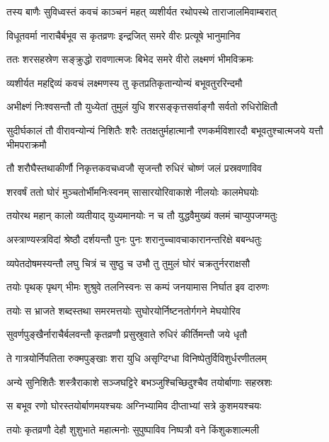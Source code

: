 \twolineshloka
{तस्य बाणैः सुविध्वस्तं कवचं काञ्चनं महत्}
{व्यशीर्यत रथोपस्थे ताराजालमिवाम्बरात्} %

\twolineshloka
{विधूतवर्मा नाराचैर्बभूव स कृतव्रणः}
{इन्द्रजित् समरे वीरः प्रत्यूषे भानुमानिव} %

\twolineshloka
{ततः शरसहस्रेण सङ्क्रुद्धो रावणात्मजः}
{बिभेद समरे वीरो लक्ष्मणं भीमविक्रमः} %

\twolineshloka
{व्यशीर्यत महद्दिव्यं कवचं लक्ष्मणस्य तु}
{कृतप्रतिकृतान्योन्यं बभूवतुररिन्दमौ} %

\twolineshloka
{अभीक्ष्णं निःश्वसन्तौ तौ युध्येतां तुमुलं युधि}
{शरसङ्कृत्तसर्वाङ्गौ सर्वतो रुधिरोक्षितौ} %

\threelineshloka
{सुदीर्घकालं तौ वीरावन्योन्यं निशितैः शरैः}
{ततक्षतुर्महात्मानौ रणकर्मविशारदौ}
{बभूवतुश्चात्मजये यत्तौ भीमपराक्रमौ} %

\twolineshloka
{तौ शरौघैस्तथाकीर्णौ निकृत्तकवचध्वजौ}
{सृजन्तौ रुधिरं चोष्णं जलं प्रस्रवणाविव} %

\twolineshloka
{शरवर्षं ततो घोरं मुञ्चतोर्भीमनिःस्वनम्}
{सासारयोरिवाकाशे नीलयोः कालमेघयोः} %

\twolineshloka
{तयोरथ महान् कालो व्यतीयाद् युध्यमानयोः}
{न च तौ युद्धवैमुख्यं क्लमं चाप्युपजग्मतुः} %

\twolineshloka
{अस्त्राण्यस्त्रविदां श्रेष्ठौ दर्शयन्तौ पुनः पुनः}
{शरानुच्चावचाकारानन्तरिक्षे बबन्धतुः} %

\twolineshloka
{व्यपेतदोषमस्यन्तौ लघु चित्रं च सुष्ठु च}
{उभौ तु तुमुलं घोरं चक्रतुर्नरराक्षसौ} %

\twolineshloka
{तयोः पृथक् पृथग् भीमः शुश्रुवे तलनिस्वनः}
{स कम्पं जनयामास निर्घात इव दारुणः} %

\twolineshloka
{तयोः स भ्राजते शब्दस्तथा समरमत्तयोः}
{सुघोरयोर्निष्टनतोर्गगने मेघयोरिव} %

\twolineshloka
{सुवर्णपुङ्खैर्नाराचैर्बलवन्तौ कृतव्रणौ}
{प्रसुस्रुवाते रुधिरं कीर्तिमन्तौ जये धृतौ} %

\twolineshloka
{ते गात्रयोर्निपतिता रुक्मपुङ्खाः शरा युधि}
{असृग्दिग्धा विनिष्पेतुर्विविशुर्धरणीतलम्} %

\twolineshloka
{अन्ये सुनिशितैः शस्त्रैराकाशे सञ्जघट्टिरे}
{बभञ्जुश्चिच्छिदुश्चैव तयोर्बाणाः सहस्रशः} %

\twolineshloka
{स बभूव रणो घोरस्तयोर्बाणमयश्चयः}
{अग्निभ्यामिव दीप्ताभ्यां सत्रे कुशमयश्चयः} %

\twolineshloka
{तयोः कृतव्रणौ देहौ शुशुभाते महात्मनोः}
{सुपुष्पाविव निष्पत्रौ वने किंशुकशाल्मली} %

